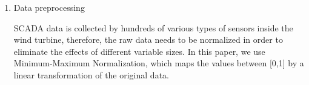 \documentclass[lettersize,journal]{IEEEtran}
\begin{document}
\begin{enumerate}%
\item Data preprocessing

SCADA data is collected by hundreds of various types of sensors inside the wind turbine, therefore, the raw data needs to be normalized in order to eliminate the effects of different variable sizes. In this paper, we use Minimum-Maximum Normalization, which maps the values between [0,1] by a linear transformation of the original data. 






\end{enumerate}
\end{document}
